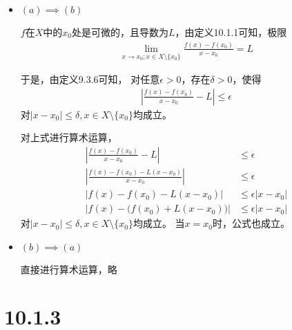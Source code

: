 \documentclass{article}
\begin{document}
\begin{itemize}
  \item $(a) \implies (b)$

        $f$在$X$中的$x_0$处是可微的，且导数为$L$，由定义10.1.1可知，极限
        \begin{align*}
          \lim\limits_{x \to x_0; x \in X \setminus \{x_0\}} \frac{f(x) - f(x_0)}{x - x_0} = L
        \end{align*}

        于是，由定义9.3.6可知，
        对任意$\epsilon > 0$，存在$\delta > 0$，使得
        \begin{align*}
          |\frac{f(x) - f(x_0)}{x - x_0} - L | \leq \epsilon
        \end{align*}
        对$|x - x_0| \leq \delta, x \in X \setminus \{x_0\}$均成立。

        对上式进行算术运算，
        \begin{align*}
          |\frac{f(x) - f(x_0)}{x - x_0} - L |       & \leq \epsilon           \\
          |\frac{f(x) - f(x_0) - L(x-x_0)}{x - x_0}| & \leq \epsilon           \\
          |f(x) - f(x_0) - L(x-x_0)|                 & \leq \epsilon |x - x_0| \\
          |f(x) - \big( f(x_0) + L(x-x_0) \big)|     & \leq \epsilon |x - x_0|
        \end{align*}
        对$|x - x_0| \leq \delta, x \in X \setminus \{x_0\}$均成立。
        当$x = x_0$时，公式也成立。

  \item $(b) \implies (a)$

        直接进行算术运算，略
\end{itemize}

\section*{10.1.3}
\end{document}
